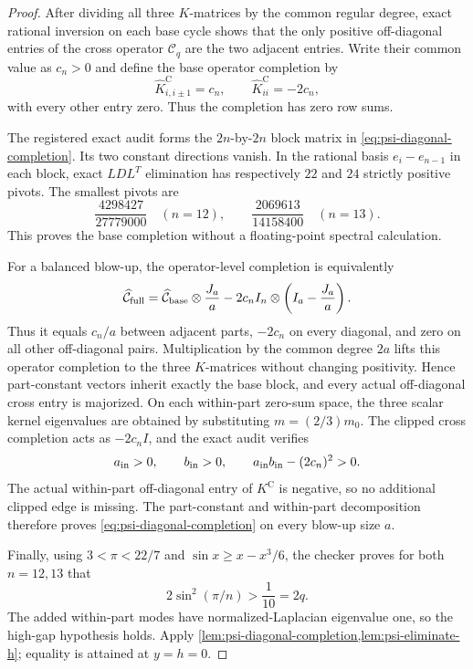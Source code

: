 \begin{proof}
After dividing all three $K$-matrices by the common regular degree, exact
rational inversion on each base cycle shows that the only positive
off-diagonal entries of the cross operator $\mathcal C_q$ are the two
adjacent entries.  Write their common value as $c_n>0$ and define the base
operator completion by
\begin{equation*}
 \widehat K^{\mathrm C}_{i,i\pm1}=c_n,
 \qquad
 \widehat K^{\mathrm C}_{ii}=-2c_n,
\end{equation*}
with every other entry zero.  Thus the completion has zero row sums.

The registered exact audit forms the $2n$-by-$2n$ block matrix in
\cref{eq:psi-diagonal-completion}.  Its two constant directions vanish.  In
the rational basis $e_i-e_{n-1}$ in each block, exact $LDL^T$ elimination
has respectively $22$ and $24$ strictly positive pivots.  The smallest
pivots are
\begin{equation*}
 \frac{4298427}{27779000}\quad(n=12),
 \qquad
 \frac{2069613}{14158400}\quad(n=13).
\end{equation*}
This proves the base completion without a floating-point spectral
calculation.

For a balanced blow-up, the operator-level completion is equivalently
\begin{equation*}
 \widehat{\mathcal C}_{\rm full}
 =\widehat{\mathcal C}_{\rm base}\otimes\frac{J_a}{a}
  -2c_n I_n\otimes\left(I_a-\frac{J_a}{a}\right).
\end{equation*}
Thus it equals $c_n/a$ between adjacent parts, $-2c_n$ on every diagonal,
and zero on all other off-diagonal pairs.  Multiplication by the common
degree $2a$ lifts this operator completion to the three $K$-matrices without
changing positivity.  Hence
part-constant vectors inherit exactly the base block, and every actual
off-diagonal cross entry is majorized.  On
each within-part zero-sum space, the three scalar kernel eigenvalues are
obtained by substituting $m=(2/3)m_0$.  The clipped cross completion acts as
$-2c_nI$, and the exact audit verifies
\begin{equation*}
 a_{\rm in}>0,\qquad b_{\rm in}>0,\qquad
 a_{\rm in}b_{\rm in}-(2c_n)^2>0.
\end{equation*}
The actual within-part off-diagonal entry of $K^{\mathrm C}$ is negative, so
no additional clipped edge is missing.  The part-constant and within-part
decomposition therefore proves \cref{eq:psi-diagonal-completion} on every
blow-up size $a$.

Finally, using $3<\pi<22/7$ and
$\sin x\geq x-x^3/6$, the checker proves for both $n=12,13$ that
\begin{equation*}
 2\sin^2(\pi/n)>\frac1{10}=2q.
\end{equation*}
The added within-part modes have normalized-Laplacian eigenvalue one, so the
high-gap hypothesis holds.  Apply
\cref{lem:psi-diagonal-completion,lem:psi-eliminate-h}; equality is attained
at $y=h=0$.
\end{proof}

